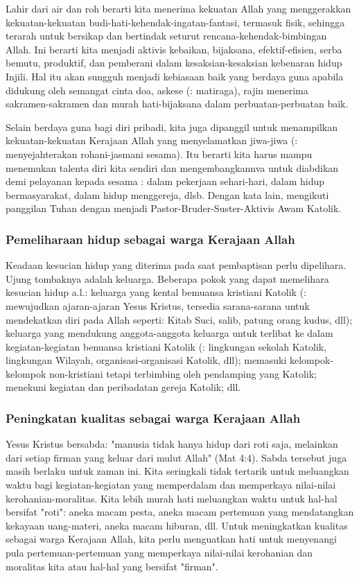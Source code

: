 \documentclass[a5paper,headsepline,titlepage,11pt,nnormalheadings,DIVcalc]{scrbook}
\begin{document}
Lahir dari air dan roh berarti kita menerima kekuatan Allah yang menggerakkan kekuatan-kekuatan budi-hati-kehendak-ingatan-fantasi, termasuk fisik, sehingga terarah untuk bersikap dan bertindak seturut rencana-kehendak-bimbingan Allah. Ini berarti kita menjadi aktivis kebaikan, bijaksana, efektif-efisien, serba bemutu, produktif, dan pemberani dalam kesaksian-kesaksian kebenaran hidup Injili. Hal itu akan sungguh menjadi kebiasaan baik yang berdaya guna apabila didukung oleh semangat cinta doa, askese (: matiraga), rajin menerima sakramen-sakramen dan murah hati-bijaksana dalam perbuatan-perbuatan baik.

Selain berdaya guna bagi diri pribadi, kita juga dipanggil untuk menampilkan kekuatan-kekuatan Kerajaan Allah yang menyelamatkan jiwa-jiwa (: menyejahterakan rohani-jasmani sesama). Itu berarti kita harus mampu menemukan talenta diri kita sendiri dan mengembangkannva untuk diabdikan demi pelayanan kepada sesama : dalam pekerjaan sehari-hari, dalam hidup bermasyarakat, dalam hidup menggereja, dlsb. Dengan kata lain, mengikuti panggilan Tuhan dengan menjadi Pastor-Bruder-Suster-Aktivis Awam Katolik.

 

\subsubsection*{Pemeliharaan hidup sebagai warga Kerajaan Allah}

Keadaan kesucian hidup yang diterima pada saat pembaptisan perlu dipelihara. Ujung tombaknya adalah keluarga. Beberapa pokok yang dapat memelihara kesucian hidup a.l.: keluarga yang kental bemuansa kristiani Katolik (: mewujudkan ajaran-ajaran Yesus Kristus, tersedia sarana-sarana untuk mendekatkan diri pada Allah seperti: Kitab Suci, salib, patung orang kudus, dll); keluarga yang mendukung anggota-anggota keluarga untuk terlibat ke dalam kegiatan-kegiatan benuansa kristiani Katolik (: lingkungan sekolah Katolik, lingkungan Wilayah, organisasi-organisasi Katolik, dll); memasuki kelompok-kelompok non-kristiani tetapi terbimbing oleh pendamping yang Katolik; menekuni kegiatan dan peribadatan gereja Katolik; dll.

 

\subsubsection*{Peningkatan kualitas sebagai warga Kerajaan Allah}

Yesus Kristus bersabda: "manusia tidak hanya hidup dari roti saja, melainkan dari setiap firman yang keluar dari mulut Allah" (Mat 4:4). Sabda tersebut juga masih berlaku untuk zaman ini. Kita seringkali tidak tertarik untuk meluangkan waktu bagi kegiatan-kegiatan yang memperdalam dan memperkaya nilai-nilai kerohanian-moralitas. Kita lebih murah hati meluangkan waktu untuk hal-hal bersifat "roti": aneka macam pesta, aneka macam pertemuan yang mendatangkan kekayaan uang-materi, aneka macam hiburan, dll. Untuk meningkatkan kualitas sebagai warga Kerajaan Allah, kita perlu menguatkan hati untuk menyenangi pula pertemuan-pertemuan yang memperkaya nilai-nilai kerohanian dan moralitas kita atau hal-hal yang bersifat "firman".
\end{document}
